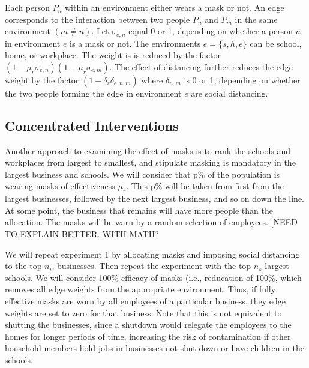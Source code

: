 \documentclass{article}
\begin{document}
Each person $P_n$ within an environment either wears a mask or not. An edge corresponds to the interaction between two people $P_n$ and $P_m$ in the same environment $(m\neq n)$. Let $\sigma_{e,n}$ equal 0 or 1, depending on whether a person $n$ in environment $e$ is  a mask or not. The environments $e=\{s,h,e\}$ can be school, home, or workplace. The weight is is reduced by the factor $(1-\mu_r\sigma_{e,n})(1-\mu_r\sigma_{e,m})$. The effect of distancing further reduces the edge weight by the factor $(1-\delta_r\delta_{e,n,m})$ where $\delta_{n,m}$ is 0 or 1, depending on whether the two people forming the edge in environment $e$ are social distancing. 


\subsection{Concentrated Interventions}
Another approach to examining the effect of masks is to rank the schools and workplaces from largest to smallest, and stipulate masking is mandatory in the largest business and schools. We will consider that p\% of the population is wearing masks of effectiveness $\mu_r$. This p\% will be taken from first from the largest businesses, followed by the next largest business, and so on down the line. At some point, the business that remains will have more people than the allocation. The masks will be warn by a random selection of employees. [NEED TO EXPLAIN BETTER. WITH MATH? 

We will repeat experiment 1 by allocating masks and imposing social distancing to the top $n_w$ businesses. 
Then repeat the experiment with the top $n_s$ largest schools. We will consider 100\% efficacy of masks (i.e., reducation of 100\%, which removes all edge weights from the appropriate environment. Thus, if fully effective masks are worn by all employees of a particular business, they edge weights are set to zero for that business. 
Note that this is not equivalent to shutting the businesses, since a shutdown would relegate the employees to the homes for longer periods of time, increasing the risk of contamination if other household members hold jobs in businesses not shut down or have children in the schools. 
\end{document}
